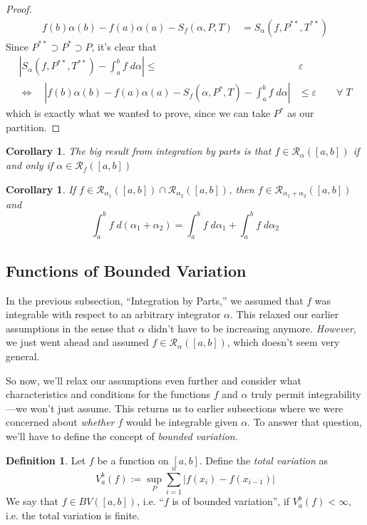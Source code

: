 \documentclass[12pt]{article}
\theoremstyle{plain}
\newtheorem{cor}[thm]{Corollary}
\theoremstyle{definition}
\newtheorem{defn}[thm]{Definition}
\theoremstyle{remark}
\begin{document}
\begin{proof}
\begin{align*}
    f(b) \alpha(b) - f(a)\alpha(a) - S_f(\alpha,P,T)
    &= S_\alpha(f, P^{**}, T^{**})
\end{align*}
Since $P^{**}\supset P^* \supset P$, it's clear that 
\begin{align*}
    \left\lvert S_\alpha(f,P^{**},T^{**}) - \int^b_a f\;d\alpha
    \right\rvert \leq &\varepsilon  \\
    \Leftrightarrow \quad 
        \left\lvert f(b) \alpha(b) - f(a)\alpha(a) 
        - S_f(\alpha,P^*,T) - 
        \int^b_a f \; d\alpha \right\rvert &\leq 
        \varepsilon \qquad \forall \; T
\end{align*}
which is exactly what we wanted to prove, since we can take $P^*$ as our partition. 
\end{proof}

\begin{cor}
The big result from integration by parts is that 
$f\in\mathscr{R}_\alpha([a,b])$ if and only if $\alpha\in\mathscr{R}_f([a,b])$
\end{cor}

\begin{cor}
If $f\in\mathscr{R}_{\alpha_1}([a,b]) \cap \mathscr{R}_{\alpha_2}([a,b])$, then $f\in\mathscr{R}_{\alpha_1 + \alpha_2}([a,b])$ and 
    \[ \int^b_a f\;d(\alpha_1 + \alpha_2) = 
    \int^b_a f\;d\alpha_1 + \int^b_a f\;d\alpha_2 \]
\end{cor}

\newpage
\subsection{Functions of Bounded Variation}

In the previous subsection, ``Integration by Parts,'' we assumed that $f$ was integrable with respect to an arbitrary integrator $\alpha$. This relaxed our earlier assumptions in the sense that $\alpha$ didn't have to be increasing anymore.  \emph{However}, we just went ahead and assumed $f\in\mathscr{R}_\alpha([a,b])$, which doesn't seem very general.

So now, we'll relax our assumptions even further and consider what characteristics and conditions for the functions $f$ and $\alpha$ truly permit integrability---we won't just assume.  This returns us to earlier subsections where we were concerned about \emph{whether} $f$ would be integrable given $\alpha$.  To answer that question, we'll have to define the concept of \emph{bounded variation}.

\begin{defn}
Let $f$ be a function on $[a,b]$. Define the \emph{total variation} as
\[ V_a^b(f) := \sup_P \sum^n_{i=1} \left\lvert f(x_i) - f(x_{i-1})
    \right\rvert \]
We say that $f \in BV([a,b])$, i.e. ``$f$ is of bounded variation'', if $V^b_a(f)<\infty$, i.e. the total variation is finite.
\end{defn}
\end{document}
